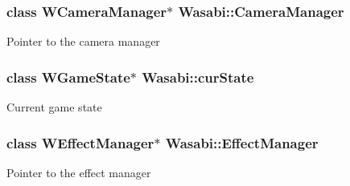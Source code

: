 \subsubsection[{\texorpdfstring{Camera\+Manager}{CameraManager}}]{\setlength{\rightskip}{0pt plus 5cm}class {\bf W\+Camera\+Manager}$\ast$ Wasabi\+::\+Camera\+Manager}\hypertarget{class_wasabi_ade6d4dcdcb056e79f00983d3a0b0d9b8}{}\label{class_wasabi_ade6d4dcdcb056e79f00983d3a0b0d9b8}
Pointer to the camera manager 
\subsubsection[{\texorpdfstring{cur\+State}{curState}}]{\setlength{\rightskip}{0pt plus 5cm}class {\bf W\+Game\+State}$\ast$ Wasabi\+::cur\+State}\hypertarget{class_wasabi_ae7101b326042bdf4a48eacae05bcb585}{}\label{class_wasabi_ae7101b326042bdf4a48eacae05bcb585}
Current game state 
\subsubsection[{\texorpdfstring{Effect\+Manager}{EffectManager}}]{\setlength{\rightskip}{0pt plus 5cm}class {\bf W\+Effect\+Manager}$\ast$ Wasabi\+::\+Effect\+Manager}\hypertarget{class_wasabi_aea0b0bf6ebfeab9064cc36e47df4411a}{}\label{class_wasabi_aea0b0bf6ebfeab9064cc36e47df4411a}
Pointer to the effect manager 
